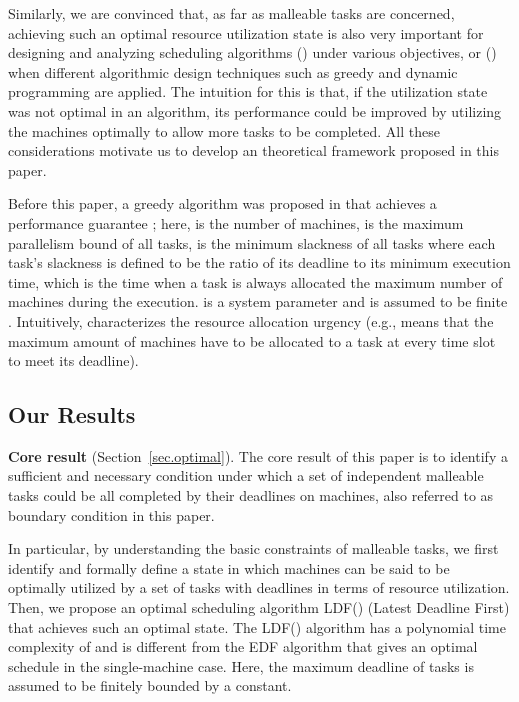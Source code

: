 \documentclass[10pt,journal,compsoc]{IEEEtran}
\newcommand{\rmnum}[1]{\romannumeral #1}
\begin{document}
Similarly, we are convinced that, as far as malleable tasks are concerned, achieving such an optimal resource utilization state is also very important for designing and analyzing scheduling algorithms (\rmnum{1}) under various objectives, or (\rmnum{2}) when different algorithmic design techniques such as greedy and dynamic programming are applied. The intuition for this is that, if the utilization state was not optimal in an algorithm, its performance could be improved by utilizing the machines optimally to allow more tasks to be completed. All these considerations motivate us to develop an theoretical framework proposed in this paper.








Before this paper, a greedy algorithm was proposed in \cite{Jain} that achieves a performance guarantee ; here,  is the number of machines,  is the maximum parallelism bound of all tasks,  is the minimum slackness of all tasks where each task's slackness is defined to be the ratio of its deadline to its minimum execution time, which is the time when a task is always allocated the maximum number of machines during the execution.  is a system parameter and is assumed to be finite \cite{White}. Intuitively,  characterizes the resource allocation urgency (e.g.,  means that the maximum amount of machines have to be allocated to a task at every time slot to meet its deadline).




\subsection{Our Results}
\label{sec.contributions}




\vspace{0.22em}\noindent\textbf{Core result} (Section~\ref{sec.optimal}). The core result of this paper is to identify a sufficient and necessary condition under which a set of independent malleable tasks could be all completed by their deadlines on  machines, also referred to as boundary condition in this paper.







In particular, by understanding the basic constraints of malleable tasks, we first identify and formally define a state in which  machines can be said to be optimally utilized by a set of tasks with deadlines in terms of resource utilization. Then, we propose an optimal scheduling algorithm LDF() (Latest Deadline First) that achieves such an optimal state. The LDF() algorithm has a polynomial time complexity of  and is different from the EDF algorithm that gives an optimal schedule in the single-machine case. Here, the maximum deadline of tasks is assumed to be finitely bounded by a constant.
\end{document}
